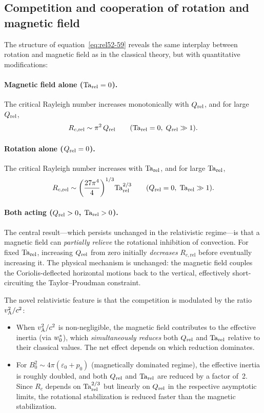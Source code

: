 \subsection{Competition and cooperation of rotation and magnetic field}
\label{sec:compete-cooperate}

The structure of equation~\eqref{eq:rel52-59} reveals the same
interplay between rotation and magnetic field as in the classical
theory, but with quantitative modifications:

\paragraph{Magnetic field alone ($\mathrm{Ta}_{\mathrm{rel}} = 0$).}
The critical Rayleigh number increases monotonically with $Q_{\mathrm{rel}}$, and
for large $Q_{\mathrm{rel}}$,
\begin{equation}
  R_{c,\mathrm{rel}} \sim \pi^{2}\,Q_{\mathrm{rel}}
  \qquad (\mathrm{Ta}_{\mathrm{rel}} = 0,\;Q_{\mathrm{rel}}\gg 1).
  \label{eq:rel52-Qalone}
\end{equation}

\paragraph{Rotation alone ($Q_{\mathrm{rel}} = 0$).}
The critical Rayleigh number increases with $\mathrm{Ta}_{\mathrm{rel}}$, and for large
$\mathrm{Ta}_{\mathrm{rel}}$,
\begin{equation}
  R_{c,\mathrm{rel}}
  \sim \left(\frac{27\pi^{4}}{4}\right)^{1/3}\!\mathrm{Ta}_{\mathrm{rel}}^{2/3}
  \qquad (Q_{\mathrm{rel}} = 0,\;\mathrm{Ta}_{\mathrm{rel}}\gg 1).
  \label{eq:rel52-Talone}
\end{equation}

\paragraph{Both acting ($Q_{\mathrm{rel}} > 0$, $\mathrm{Ta}_{\mathrm{rel}} > 0$).}
The central result---which persists unchanged in the relativistic
regime---is that a magnetic field can \emph{partially relieve} the
rotational inhibition of convection.  For fixed $\mathrm{Ta}_{\mathrm{rel}}$, increasing
$Q_{\mathrm{rel}}$ from zero initially \emph{decreases} $R_{c,\mathrm{rel}}$
before eventually increasing it.  The physical mechanism is unchanged:
the magnetic field couples the Coriolis-deflected horizontal motions
back to the vertical, effectively short-circuiting the Taylor--Proudman
constraint.

The novel relativistic feature is that the competition is modulated by
the ratio $v_{\mathrm{A}}^{2}/c^{2}$:
\begin{itemize}
\item When $v_{\mathrm{A}}^{2}/c^{2}$ is non-negligible, the magnetic field
  contributes to the effective inertia (via $w^{*}_{0}$),
  which \emph{simultaneously reduces} both $Q_{\mathrm{rel}}$ and $\mathrm{Ta}_{\mathrm{rel}}$
  relative to their classical values.  The net effect depends on
  which reduction dominates.
\item For $B_0^{2} \sim 4\pi(\varepsilon_{0}+p_{0})$ (magnetically
  dominated regime), the effective inertia is roughly doubled, and
  both $Q_{\mathrm{rel}}$ and $\mathrm{Ta}_{\mathrm{rel}}$ are reduced by a factor of~2.
  Since $R_c$ depends on $\mathrm{Ta}_{\mathrm{rel}}^{2/3}$ but linearly on $Q_{\mathrm{rel}}$ in
  the respective asymptotic limits, the rotational stabilization is
  reduced faster than the magnetic stabilization.
\end{itemize}

